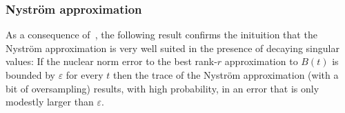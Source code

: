 %
%
%
\subsubsection{Nyström approximation}
\label{subsec:nystrom}

As a consequence of~\cite{kressner-2024-randomized-lowrank}, the following result confirms the inituition that the Nystr\"om approximation is very well suited in the presence of decaying singular values: If the nuclear norm error to the best rank-$r$ approximation to $B(t)$ is bounded by $\varepsilon$ for every $t$ then the trace of the Nystr\"om approximation (with a bit of oversampling) results, with high probability, in an error that is only modestly larger than $\varepsilon$.


